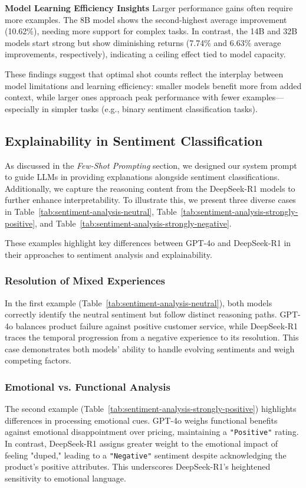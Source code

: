 \documentclass{IEEEcsmag}
\begin{document}
\textbf{Model Learning Efficiency Insights}
Larger performance gains often require more examples. The 8B model shows the second-highest average improvement (10.62\%), needing more support for complex tasks. In contrast, the 14B and 32B models start strong but show diminishing returns (7.74\% and 6.63\% average improvements, respectively), indicating a ceiling effect tied to model capacity.

\noindent These findings suggest that optimal shot counts reflect the interplay between model limitations and learning efficiency: smaller models benefit more from added context, while larger ones approach peak performance with fewer examples—especially in simpler tasks (e.g., binary sentiment classification tasks).

\vspace{-15pt}
\subsection{Explainability in Sentiment Classification}

As discussed in the \textit{Few-Shot Prompting} section, we designed our system prompt to guide LLMs in providing explanations alongside sentiment classifications. Additionally, we capture the reasoning content from the DeepSeek-R1 models to further enhance interpretability. To illustrate this, we present three diverse cases in Table~\ref{tab:sentiment-analysis-neutral}, Table~\ref{tab:sentiment-analysis-strongly-positive}, and Table~\ref{tab:sentiment-analysis-strongly-negative}.

These examples highlight key differences between GPT-4o and DeepSeek-R1 in their approaches to sentiment analysis and explainability.
\vspace{-10pt}
\subsubsection{\textbf{Resolution of Mixed Experiences}}
In the first example (Table~\ref{tab:sentiment-analysis-neutral}), both models correctly identify the neutral sentiment but follow distinct reasoning paths. GPT-4o balances product failure against positive customer service, while DeepSeek-R1 traces the temporal progression from a negative experience to its resolution. This case demonstrates both models' ability to handle evolving sentiments and weigh competing factors.
\vspace{-10pt}
\subsubsection{\textbf{Emotional vs. Functional Analysis}}
The second example (Table~\ref{tab:sentiment-analysis-strongly-positive}) highlights differences in processing emotional cues. GPT-4o weighs functional benefits against emotional disappointment over pricing, maintaining a \texttt{"Positive"} rating. In contrast, DeepSeek-R1 assigns greater weight to the emotional impact of feeling "duped," leading to a \texttt{"Negative"} sentiment despite acknowledging the product's positive attributes. This underscores DeepSeek-R1's heightened sensitivity to emotional language.
\vspace{-10pt}
\end{document}
